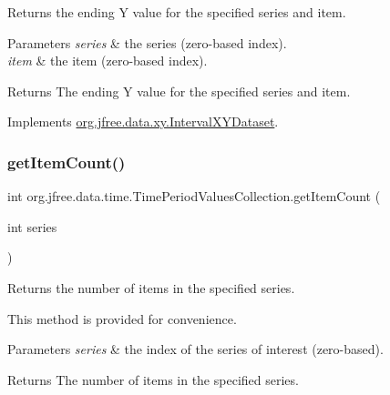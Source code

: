 Returns the ending Y value for the specified series and item.


\begin{DoxyParams}{Parameters}
{\em series} & the series (zero-\/based index). \\
\hline
{\em item} & the item (zero-\/based index).\\
\hline
\end{DoxyParams}
\begin{DoxyReturn}{Returns}
The ending Y value for the specified series and item. 
\end{DoxyReturn}


Implements \mbox{\hyperlink{interfaceorg_1_1jfree_1_1data_1_1xy_1_1_interval_x_y_dataset_ae938af574bad07e7f47a8b423223ef9b}{org.\+jfree.\+data.\+xy.\+Interval\+X\+Y\+Dataset}}.

\mbox{\label{classorg_1_1jfree_1_1data_1_1time_1_1_time_period_values_collection_aaa63a2c05b1a61f655cc24115fcdd63e}} 
\subsubsection{\texorpdfstring{get\+Item\+Count()}{getItemCount()}}
{\footnotesize\ttfamily int org.\+jfree.\+data.\+time.\+Time\+Period\+Values\+Collection.\+get\+Item\+Count (\begin{DoxyParamCaption}\item[{int}]{series }\end{DoxyParamCaption})}

Returns the number of items in the specified series. 

This method is provided for convenience.


\begin{DoxyParams}{Parameters}
{\em series} & the index of the series of interest (zero-\/based).\\
\hline
\end{DoxyParams}
\begin{DoxyReturn}{Returns}
The number of items in the specified series. 
\end{DoxyReturn}


